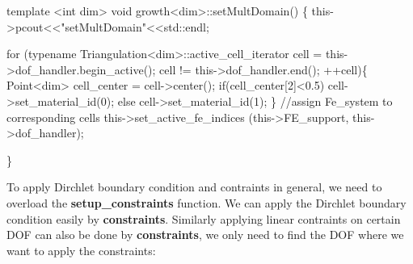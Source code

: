 \begin{DoxyCode}
\textcolor{keyword}{template} <\textcolor{keywordtype}{int} dim>
\textcolor{keywordtype}{void} growth<dim>::setMultDomain()
\{
    this->pcout<<\textcolor{stringliteral}{"setMultDomain"}<<std::endl;
    
  \textcolor{keywordflow}{for} (\textcolor{keyword}{typename} Triangulation<dim>::active\_cell\_iterator cell = this->dof\_handler.begin\_active(); cell != 
      this->dof\_handler.end(); ++cell)\{
    Point<dim> cell\_center = cell->center();
        \textcolor{keywordflow}{if}(cell\_center[2]<0.5) cell->set\_material\_id(0);
        \textcolor{keywordflow}{else} cell->set\_material\_id(1);
    \}
    \textcolor{comment}{//assign Fe\_system to corresponding cells}
    this->set\_active\_fe\_indices (this->FE\_support, this->dof\_handler);
    
\}
\end{DoxyCode}
 To apply Dirchlet boundary condition and contraints in general, we need to overload the {\bfseries setup\-\_\-constraints} function. We can apply the Dirchlet boundary condition easily by {\bfseries constraints}. Similarly applying linear contraints on certain D\-O\-F can also be done by {\bfseries  constraints}, we only need to find the D\-O\-F where we want to apply the constraints\-: 

